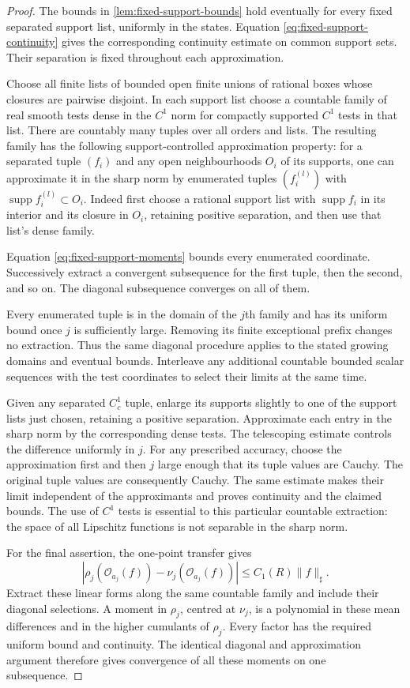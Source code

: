 \documentclass[11pt,letterpaper,reqno]{amsart}
\theoremstyle{definition}
\theoremstyle{remark}
\newcommand{\cO}{\mathcal O}
\begin{document}
\begin{proof}
The bounds in \cref{lem:fixed-support-bounds} hold eventually
for every fixed separated support list, uniformly in the states.
Equation \eqref{eq:fixed-support-continuity} gives the corresponding
continuity estimate on common support sets. Their separation is
fixed throughout each approximation.

Choose all finite lists of bounded open finite unions of rational
boxes whose closures are pairwise disjoint. In each support list
choose a countable family of real smooth tests dense in the
\(C^1\) norm for compactly supported \(C^1\) tests in that list.
There are countably many tuples over all orders and lists.
The resulting family has the following support-controlled
approximation property: for a separated tuple \((f_i)\)
and any open neighbourhoods \(O_i\) of its supports,
one can approximate it in the sharp norm by enumerated
tuples \((f_i^{(l)})\) with
\(\operatorname{supp}f_i^{(l)}\subset O_i\).
Indeed first choose a rational support list with
\(\operatorname{supp}f_i\) in its interior and its closure
in \(O_i\), retaining positive separation, and then use
that list's dense family.

Equation \eqref{eq:fixed-support-moments} bounds every
enumerated coordinate. Successively extract a convergent
subsequence for the first tuple, then the second, and so
on. The diagonal subsequence converges on all of them.


Every enumerated tuple is in the domain of the $j$th family and has
its uniform bound once $j$ is sufficiently large. Removing its finite
exceptional prefix changes no extraction. Thus the same diagonal
procedure applies to the stated growing domains and eventual bounds.
Interleave any additional countable bounded scalar sequences with the
test coordinates to select their limits at the same time.

Given any separated $C_c^1$ tuple, enlarge its supports slightly to
one of the support lists just chosen, retaining a positive separation.
Approximate each entry in the sharp norm by the corresponding dense
tests. The telescoping estimate controls the difference uniformly in
$j$. For any prescribed accuracy, choose the approximation first and
then $j$ large enough that its tuple values are Cauchy. The original
tuple values are consequently Cauchy. The same estimate makes their
limit independent of the approximants and proves continuity and the
claimed bounds. The use of $C^1$ tests is essential to this particular
countable extraction: the space of all Lipschitz functions is not
separable in the sharp norm.

For the final assertion, the one-point transfer gives
\[
 |\rho_j(\cO_{a_j}(f))-\nu_j(\cO_{a_j}(f))|
                       \le C_1(R)\|f\|_\sharp.
\]
Extract these linear forms along the same countable family and include
their diagonal selections. A moment in $\rho_j$, centred at $\nu_j$,
is a polynomial in these mean differences and in the higher cumulants
of $\rho_j$. Every factor has the required uniform bound and
continuity. The identical diagonal and approximation argument therefore
gives convergence of all these moments on one subsequence.
\end{proof}
\end{document}
